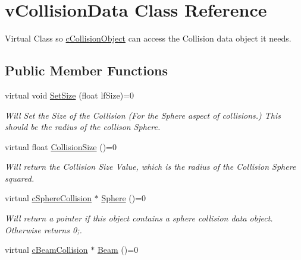 \hypertarget{classv_collision_data}{
\section{vCollisionData Class Reference}
\label{classv_collision_data}
}


Virtual Class so \hyperlink{classc_collision_object}{cCollisionObject} can access the Collision data object it needs.  


\subsection*{Public Member Functions}
\begin{DoxyCompactItemize}
\item 
\hypertarget{classv_collision_data_a00a42430617c673f7716e1b543020dd3}{
virtual void \hyperlink{classv_collision_data_a00a42430617c673f7716e1b543020dd3}{SetSize} (float lfSize)=0}
\label{classv_collision_data_a00a42430617c673f7716e1b543020dd3}

\begin{DoxyCompactList}\small\item\em Will Set the Size of the Collision (For the Sphere aspect of collisions.) This should be the radius of the collison Sphere. \end{DoxyCompactList}\item 
\hypertarget{classv_collision_data_a294ee887b1da0cfd16c0f3ce22f3e42d}{
virtual float \hyperlink{classv_collision_data_a294ee887b1da0cfd16c0f3ce22f3e42d}{CollisionSize} ()=0}
\label{classv_collision_data_a294ee887b1da0cfd16c0f3ce22f3e42d}

\begin{DoxyCompactList}\small\item\em Will return the Collision Size Value, which is the radius of the Collision Sphere squared. \end{DoxyCompactList}\item 
\hypertarget{classv_collision_data_abdd66f6f80f7af9925923add7069efb0}{
virtual \hyperlink{classc_sphere_collision}{cSphereCollision} $\ast$ \hyperlink{classv_collision_data_abdd66f6f80f7af9925923add7069efb0}{Sphere} ()=0}
\label{classv_collision_data_abdd66f6f80f7af9925923add7069efb0}

\begin{DoxyCompactList}\small\item\em Will return a pointer if this object contains a sphere collision data object. Otherwise returns 0;. \end{DoxyCompactList}\item 
\hypertarget{classv_collision_data_a8ecc16b27147cb9105b70c3e4eec80e9}{
virtual \hyperlink{classc_beam_collision}{cBeamCollision} $\ast$ \hyperlink{classv_collision_data_a8ecc16b27147cb9105b70c3e4eec80e9}{Beam} ()=0}
\label{classv_collision_data_a8ecc16b27147cb9105b70c3e4eec80e9}


\end{DoxyCompactItemize}
